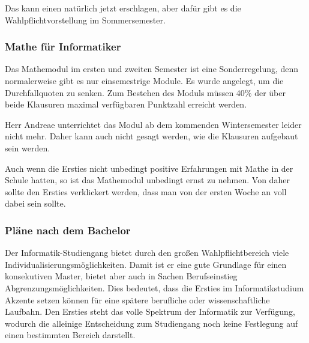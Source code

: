 \documentclass[a4paper,11pt]{scrartcl} %
\begin{document}
Das kann einen natürlich jetzt erschlagen, aber dafür gibt es die Wahlpflichtvorstellung im Sommersemester.

		\subsubsection*{Mathe für Informatiker}
		
Das Mathemodul im ersten und zweiten Semester ist eine Sonderregelung, denn normalerweise gibt es nur einsemestrige Module. Es wurde angelegt, um die Durchfallquoten zu senken. Zum Bestehen des Moduls müssen 40\% der über beide Klausuren maximal verfügbaren Punktzahl erreicht werden.

Herr Andreae unterrichtet das Modul ab dem kommenden Wintersemester leider nicht mehr. Daher kann auch nicht gesagt werden, wie die Klausuren aufgebaut sein werden.

Auch wenn die Ersties nicht unbedingt positive Erfahrungen mit Mathe in der Schule hatten, so ist das Mathemodul unbedingt ernst zu nehmen. Von daher sollte den Ersties verklickert werden, dass man von der ersten Woche an voll dabei sein sollte.

		\subsubsection*{Pläne nach dem Bachelor}

Der Informatik-Studiengang bietet durch den großen Wahlpflichtbereich viele Individualisierungsmöglichkeiten. Damit ist er eine gute Grundlage für einen konsekutiven Master, bietet aber auch in Sachen Berufseinstieg Abgrenzungsmöglichkeiten. Dies bedeutet, dass die Ersties im Informatikstudium Akzente setzen können für eine spätere berufliche oder wissenschaftliche Laufbahn. Den Ersties steht das volle Spektrum der Informatik zur Verfügung, wodurch die alleinige Entscheidung zum Studiengang noch keine Festlegung auf einen bestimmten Bereich darstellt.
  
\end{document}
